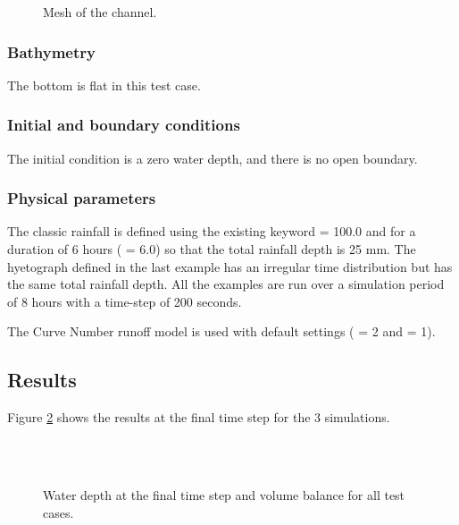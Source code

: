 \begin{figure}[!htbp]
 \centering
 \caption{Mesh of the channel.}
 \label{pluie:fig:mesh}
\end{figure}

\subsubsection{Bathymetry}

The bottom is flat in this test case.

\subsubsection{Initial and boundary conditions}

The initial condition is a zero water depth, and there is no open boundary.

\subsubsection{Physical parameters}

The classic rainfall is defined using the existing keyword
 = 100.0 and for a duration of 6 hours
( = 6.0) so that the total
rainfall depth is 25 mm.
The hyetograph defined in the last example has an irregular time distribution
but has the same total rainfall depth.
All the examples are run over a simulation period of 8 hours with a time-step of
200 seconds.

The Curve Number runoff model is used with default settings
( = 2 and
 = 1).

\subsection{Results}

Figure \ref{pluie:fig:res} shows the results at the final time step for the 3
simulations.

\begin{figure}[!htbp]
 \centering
 \\
 \\
 \caption{Water depth at the final time step and volume balance for all test cases.}
 \label{pluie:fig:res}
\end{figure}

